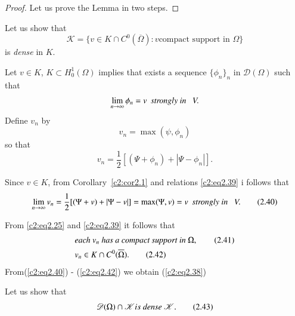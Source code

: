 \begin{proof}
Let us prove the Lemma in two steps.
\end{proof} 
 
\begin{step}\label{c2:st1}%
Let us show that
\begin{equation}
\mathscr{K} = \{ v \in K \cap C^0 (\overline{\Omega}) : v
\text{compact support in } \Omega \}\tag{2.38}\label{c2:eq2.38} 
\end{equation} 
is \textit{dense} in $K$.
\end{step}
 
 Let $v \in K$, $K \subset H^1_0(\Omega) $ implies that exists a
 sequence $\{\phi_n\}_n$ in $\mathscr{D}(\Omega)$ such that   
$$
\lim_{n \to \infty} \phi_n = v~~ \text{\em strongly in }~~V.
$$
Define $v_n$ by 
\begin{equation}
v_n = \max (\psi, \phi_n) \tag{2.39}\label{c2:eq2.39}
\end{equation}  
so that 
$$
v_n = \frac{1}{2} [(\Psi + \phi_n) + |\Psi - \phi_n |].
$$
  
Since $v \in K$, from Corollary~\ref{c2:cor2.1} and 
relations \eqref{c2:eq2.39} i follows that 
\begin{equation}
\lim_{n \to \infty} v_n = \frac{1}{2} [(\Psi + v)+ |\Psi - v|] = \max
(\Psi, v) = v~~ \text{\em strongly in }~~V.\tag{2.40}\label{c2:eq2.40} 
\end{equation}  

From \eqref{c2:eq2.25} and \eqref{c2:eq2.39} it follows that 
\begin{align}
&\text{\em each } v_n  \text{ \em has a compact support in }\Omega,
  \tag{2.41}\label{c2:eq2.41}\\ 
&v_n \in K \cap C^0 (\overline{\Omega}). \tag{2.42}\label{c2:eq2.42}
\end{align}  
 From\pageoriginale  (\ref{c2:eq2.40}) - (\ref{c2:eq2.42}) we obtain
 (\ref{c2:eq2.38}) 
 
\begin{step}\label{c2:st2}%
Let us show that 
\begin{equation}
\mathscr{D} (\Omega ) \cap \mathscr{K} is \text{ \em dense }
\mathscr{K}.\tag{2.43}\label{c2:eq2.43} 
\end{equation} 
\end{step} 
 
